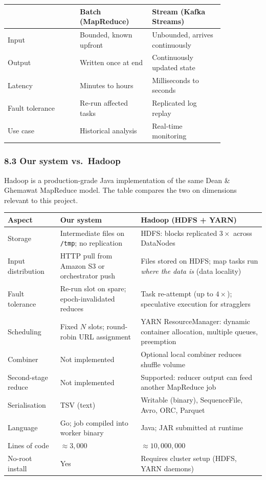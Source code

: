 \documentclass[
]{article}
\begin{document}
\begin{center}\small
\begin{tabular}{p{0.28\linewidth} p{0.28\linewidth} p{0.28\linewidth}}
\toprule
 & \textbf{Batch (MapReduce)} & \textbf{Stream (Kafka Streams)} \\
\midrule
Input & Bounded, known upfront & Unbounded, arrives continuously \\
Output & Written once at end & Continuously updated state \\
Latency & Minutes to hours & Milliseconds to seconds \\
Fault tolerance & Re-run affected tasks & Replicated log replay \\
Use case & Historical analysis & Real-time monitoring \\
\bottomrule
\end{tabular}
\end{center}

\subsubsection{8.3 Our system vs.\ Hadoop}\label{vs-hadoop}

Hadoop is a production-grade Java implementation of the same Dean \& Ghemawat
MapReduce model. The table compares the two on dimensions relevant to this
project.

\begin{center}\small
\begin{tabular}{p{2.8cm} p{5.5cm} p{5.5cm}}
\toprule
\textbf{Aspect} & \textbf{Our system} & \textbf{Hadoop (HDFS + YARN)} \\
\midrule
Storage & Intermediate files on \texttt{/tmp}; no replication & HDFS: blocks
  replicated $3\times$ across DataNodes \\
Input distribution & HTTP pull from Amazon S3 or orchestrator push & Files
  stored on HDFS; map tasks run \emph{where the data is} (data locality) \\
Fault tolerance & Re-run slot on spare; epoch-invalidated reduces & Task
  re-attempt (up to $4\times$); speculative execution for stragglers \\
Scheduling & Fixed $N$ slots; round-robin URL assignment & YARN
  ResourceManager: dynamic container allocation, multiple queues, preemption \\
Combiner & Not implemented & Optional local combiner reduces shuffle volume \\
Second-stage reduce & Not implemented & Supported: reducer output can feed
  another MapReduce job \\
Serialisation & TSV (text) & Writable (binary), SequenceFile, Avro, ORC,
  Parquet \\
Language & Go; job compiled into worker binary & Java; JAR submitted at
  runtime \\
Lines of code & $\approx 3{,}000$ & $\approx 10{,}000{,}000$ \\
No-root install & Yes & Requires cluster setup (HDFS, YARN daemons) \\
\bottomrule
\end{tabular}
\end{center}
\end{document}
